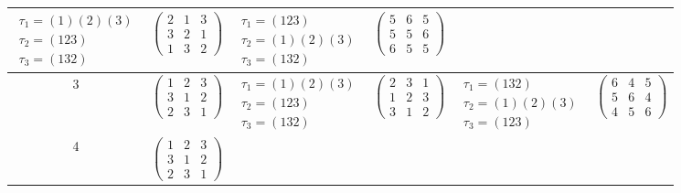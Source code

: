 \begin{longtable}{|c|p{2.7cm}|p{2.5cm}|p{2.7cm}|p{2.5cm}|p{2.7cm}|}
    $\begin{array}{l}\tau_1=(1)(2)(3)\\ \tau_2=(123)\\ \tau_3=(132)\end{array}$ &
    $\begin{pmatrix}2&1&3\\3&2&1\\1&3&2\end{pmatrix}$                           &
    $\begin{array}{l}\tau_1=(123)\\ \tau_2=(1)(2)(3)\\ \tau_3=(132)\end{array}$ &
    $\begin{pmatrix}5&6&5\\5&5&6\\6&5&5\end{pmatrix}$                                                                                                       \\
    \hline
    3                                                                           &
    $\begin{pmatrix}1&2&3\\3&1&2\\2&3&1\end{pmatrix}$                           &
    $\begin{array}{l}\tau_1=(1)(2)(3)\\ \tau_2=(123)\\ \tau_3=(132)\end{array}$ &
    $\begin{pmatrix}2&3&1\\1&2&3\\3&1&2\end{pmatrix}$                           &
    $\begin{array}{l}\tau_1=(132)\\ \tau_2=(1)(2)(3)\\ \tau_3=(123)\end{array}$ &
    $\begin{pmatrix}6&4&5\\5&6&4\\4&5&6\end{pmatrix}$                                                                                                       \\
    \hline
    4                                                                           &
    $\begin{pmatrix}1&2&3\\3&1&2\\2&3&1\end{pmatrix}$                           &

\end{longtable}
